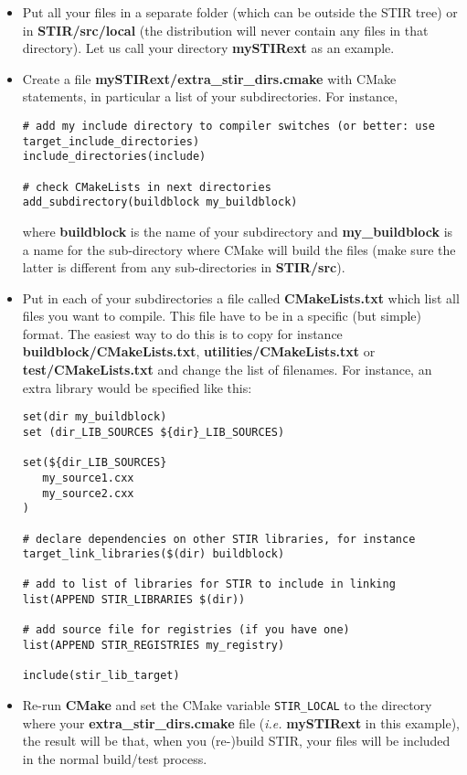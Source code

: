 \documentclass{article}
\begin{document}
\begin{itemize}
\item Put all your files in a separate folder (which can be outside the STIR tree) or in \textbf{STIR/src/local} (the distribution 
will never contain any files in that directory). Let us call your directory 
\textbf{mySTIRext} as an example.
\item Create a file \textbf{mySTIRext/extra\_stir\_dirs.cmake} with CMake statements,
in particular a list of your subdirectories. For instance,
\begin{verbatim}
# add my include directory to compiler switches (or better: use target_include_directories)
include_directories(include)

# check CMakeLists in next directories
add_subdirectory(buildblock my_buildblock)
\end{verbatim}
where \textbf{buildblock} is the name of your subdirectory and \textbf{my\_buildblock} is a name for the
sub-directory where CMake will build the files (make sure the latter is different from any
sub-directories in \textbf{STIR/src}).

\item Put in each of your subdirectories a file called \textbf{CMakeLists.txt}
which list all files you want to compile. This file have to 
be in a specific (but simple) format. The easiest way to do this 
is to copy for instance \textbf{buildblock/CMakeLists.txt}, \textbf{utilities/CMakeLists.txt}
or  \textbf{test/CMakeLists.txt} and change the list of filenames. For instance, an extra library
would be specified like this:
\begin{verbatim}
set(dir my_buildblock)
set (dir_LIB_SOURCES ${dir}_LIB_SOURCES)

set(${dir_LIB_SOURCES}
   my_source1.cxx
   my_source2.cxx
)

# declare dependencies on other STIR libraries, for instance
target_link_libraries($(dir) buildblock)

# add to list of libraries for STIR to include in linking
list(APPEND STIR_LIBRARIES $(dir))

# add source file for registries (if you have one)
list(APPEND STIR_REGISTRIES my_registry)

include(stir_lib_target)
\end{verbatim}

\item Re-run \textbf{CMake} and set the CMake variable \texttt{STIR\_LOCAL} to the directory where your
\textbf{extra\_stir\_dirs.cmake} file (\textit{i.e.} \textbf{mySTIRext} in this example),
the result will be that, when you (re-)build STIR, your files will be included in 
the normal build/test process.
\end{itemize}
\end{document}
